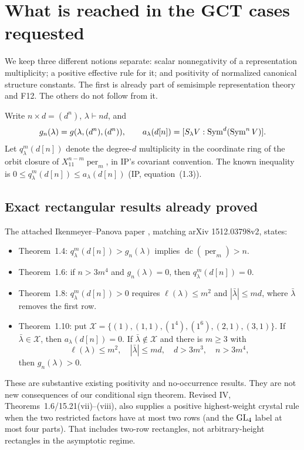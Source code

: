 \documentclass[11pt,a4paper]{article}
\newcommand{\fid}[1]{\textsf{#1}}\newcommand{\gate}[1]{\textsf{#1}}
\theoremstyle{named}\newtheorem{finding}{Finding}[section]
\theoremstyle{definition}\newtheorem{definition}[finding]{Definition}
\theoremstyle{remark}\newtheorem{remark}[finding]{Remark}
\begin{document}
\section{What is reached in the GCT cases requested}\label{sec:rectangles}
We keep three different notions separate: scalar nonnegativity of a representation multiplicity; a positive effective rule for it; and positivity of normalized canonical structure constants. The first is already part of semisimple representation theory and \fid{F12}. The others do not follow from it.

Write $n\times d=(d^n)$, $\lambda\vdash nd$, and
\[
 g_n(\lambda)=g(\lambda,(d^n),(d^n)),\qquad
 a_\lambda(d[n])=[S_\lambda V:\operatorname{Sym}^d(\operatorname{Sym}^nV)].
\]
Let $q^m_\lambda(d[n])$ denote the degree-$d$ multiplicity in the coordinate ring of the orbit closure of $X_{11}^{n-m}\operatorname{per}_m$, in IP's covariant convention. The known inequality is $0\le q^m_\lambda(d[n])\le a_\lambda(d[n])$ (IP, equation~(1.3)).

\subsection{Exact rectangular results already proved}
The attached Ikenmeyer--Panova paper \cite{IP}, matching arXiv 1512.03798v2, states:
\begin{itemize}
\item Theorem~1.4: $q^m_\lambda(d[n])>g_n(\lambda)$ implies $\operatorname{dc}(\operatorname{per}_m)>n$.
\item Theorem~1.6: if $n>3m^4$ and $g_n(\lambda)=0$, then $q^m_\lambda(d[n])=0$.
\item Theorem~1.8: $q^m_\lambda(d[n])>0$ requires $\ell(\lambda)\le m^2$ and $|\bar\lambda|\le md$, where $\bar\lambda$ removes the first row.
\item Theorem~1.10: put
$\mathcal X=\{(1),(1,1),(1^4),(1^6),(2,1),(3,1)\}$.
If $\bar\lambda\in\mathcal X$, then $a_\lambda(d[n])=0$. If $\bar\lambda\notin\mathcal X$ and there is $m\ge3$ with
\[
 \ell(\lambda)\le m^2,\quad |\bar\lambda|\le md,\quad
 d>3m^3,\quad n>3m^4,
\]
then $g_n(\lambda)>0$.
\end{itemize}
These are substantive existing positivity and no-occurrence results. They are not new consequences of our conditional sign theorem. Revised IV, Theorems~1.6/15.21(vii)--(viii), also supplies a positive highest-weight crystal rule when the two restricted factors have at most two rows (and the $\mathrm{GL}_4$ label at most four parts). That includes two-row rectangles, not arbitrary-height rectangles in the asymptotic regime.
\end{document}
